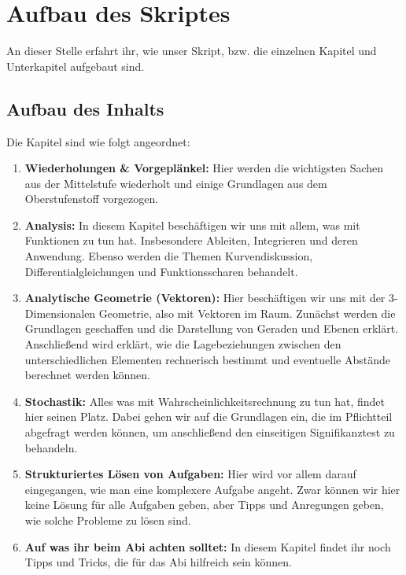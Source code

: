 \chapter*{Aufbau des Skriptes}
	An dieser Stelle erfahrt ihr, wie unser Skript, bzw. die einzelnen Kapitel und
	Unterkapitel aufgebaut sind.
	\section*{Aufbau des Inhalts}
	Die Kapitel sind wie folgt angeordnet:
		\begin{enumerate}
		  \item \textbf{Wiederholungen \& Vorgeplänkel:} Hier werden die wichtigsten
		  Sachen aus der Mittelstufe wiederholt und einige Grundlagen aus
		  dem Oberstufenstoff vorgezogen.
		  \item \textbf{Analysis:} In diesem Kapitel beschäftigen wir uns mit allem,
		  was mit Funktionen zu tun hat. Insbesondere Ableiten, Integrieren und deren
		  Anwendung. Ebenso werden die Themen Kurvendiskussion,
		  Differentialgleichungen und Funktionsscharen behandelt.
		  \item \textbf{Analytische Geometrie (Vektoren):} Hier beschäftigen wir uns
		  mit der 3-Dimensionalen Geometrie, also mit Vektoren im Raum. Zunächst
		  werden die Grundlagen geschaffen und die Darstellung von Geraden und
		  Ebenen erklärt. Anschließend wird erklärt, wie die Lagebeziehungen zwischen
		  den unterschiedlichen Elementen rechnerisch bestimmt und eventuelle
		  Abstände berechnet werden können.
		  \item \textbf{Stochastik:} Alles was mit Wahrscheinlichkeitsrechnung zu tun
		  hat, findet hier seinen Platz. Dabei gehen wir auf die Grundlagen ein, die
		  im Pflichtteil abgefragt werden können, um anschließend den einseitigen
		  Signifikanztest zu behandeln.
		  \item \textbf{Strukturiertes Lösen von Aufgaben:} Hier wird vor allem darauf
		  eingegangen, wie man eine komplexere Aufgabe angeht. Zwar können wir hier
		  keine Lösung für alle Aufgaben geben, aber Tipps und Anregungen geben, wie
		  solche Probleme zu lösen sind.
		  \item \textbf{Auf was ihr beim Abi achten solltet:} In diesem Kapitel findet
		  ihr noch Tipps und Tricks, die für das Abi hilfreich sein können.
		\end{enumerate}
	
	\newpage %
